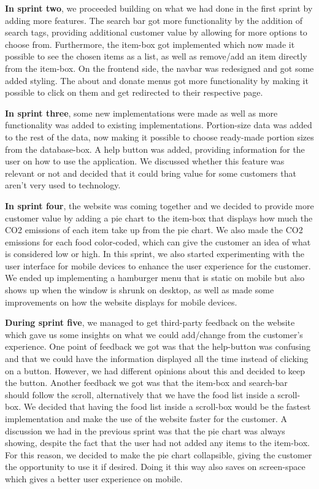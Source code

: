 \textbf{In sprint two}, we proceeded building on what we had done in the first sprint by adding more features. The search bar got more functionality by the addition of search tags, providing additional customer value by allowing for more options to choose from. Furthermore, the item-box got implemented which now made it possible to see the chosen items as a list, as well as remove/add an item directly from the item-box. On the frontend side, the navbar was redesigned and got some added styling. The about and donate menus got more functionality by making it possible to click on them and get redirected to their respective page. 

\textbf{In sprint three}, some new implementations were made as well as more functionality was added to existing implementations. Portion-size data was added to the rest of the data, now making it possible to choose ready-made portion sizes from the database-box. A help button was added, providing information for the user on how to use the application. We discussed whether this feature was relevant or not and decided that it could bring value for some customers that aren’t very used to technology. 

\textbf{In sprint four}, the website was coming together and we decided to provide more customer value by adding a pie chart to the item-box that displays how much the CO2 emissions of each item take up from the pie chart. We also made the CO2 emissions for each food color-coded, which can give the customer an idea of what is considered low or high. In this sprint, we also started experimenting with the user interface for mobile devices to enhance the user experience for the customer. We ended up implementing a hamburger menu that is static on mobile but also shows up when the window is shrunk on desktop, as well as made some improvements on how the website displays for mobile devices. 

\textbf{During sprint five}, we managed to get third-party feedback on the website which gave us some insights on what we could add/change from the customer's experience. One point of feedback we got was that the help-button was confusing and that we could have the information displayed all the time instead of clicking on a button. However, we had different opinions about this and decided to keep the button. Another feedback we got was that the item-box and search-bar should follow the scroll, alternatively that we have the food list inside a scroll-box. We decided that having the food list inside a scroll-box would be the fastest implementation and make the use of the website faster for the customer. A discussion we had in the previous sprint was that the pie chart was always showing, despite the fact that the user had not added any items to the item-box. For this reason, we decided to make the pie chart collapsible, giving the customer the opportunity to use it if desired. Doing it this way also saves on screen-space which gives a better user experience on mobile. 

